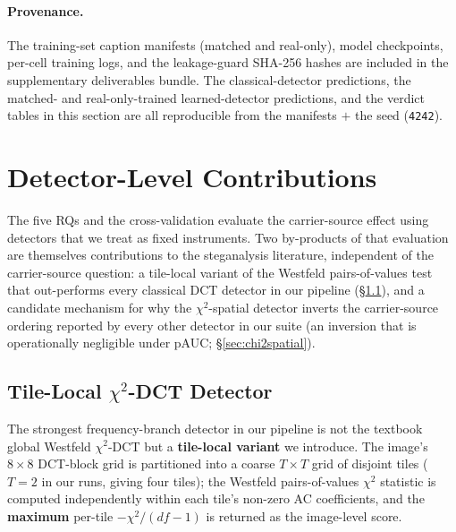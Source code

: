 \documentclass[10pt,twocolumn,a4paper]{article}
\begin{document}
\paragraph{Provenance.} The training-set caption manifests (matched and real-only), model checkpoints, per-cell training logs, and the leakage-guard SHA-256 hashes are included in the supplementary deliverables bundle. The classical-detector predictions, the matched- and real-only-trained learned-detector predictions, and the verdict tables in this section are all reproducible from the manifests $+$ the seed (\texttt{4242}).

\section{Detector-Level Contributions}
\label{sec:detector-side}

The five RQs and the cross-validation evaluate the carrier-source effect using detectors that we treat as fixed instruments.  Two by-products of that evaluation are themselves contributions to the steganalysis literature, independent of the carrier-source question: a tile-local variant of the Westfeld pairs-of-values test that out-performs every classical DCT detector in our pipeline (\S\ref{sec:tiled}), and a candidate mechanism for why the $\chi^2$-spatial detector inverts the carrier-source ordering reported by every other detector in our suite (an inversion that is operationally negligible under pAUC; \S\ref{sec:chi2spatial}).

\subsection{Tile-Local $\chi^2$-DCT Detector}
\label{sec:tiled}

The strongest frequency-branch detector in our pipeline is not the textbook global Westfeld $\chi^2$-DCT but a \textbf{tile-local variant} we introduce. The image's $8\!\times\!8$ DCT-block grid is partitioned into a coarse $T\!\times\!T$ grid of disjoint tiles ($T\!=\!2$ in our runs, giving four tiles); the Westfeld pairs-of-values $\chi^2$ statistic is computed independently within each tile's non-zero AC coefficients, and the \textbf{maximum} per-tile $-\chi^2/(df\!-\!1)$ is returned as the image-level score.
\end{document}
